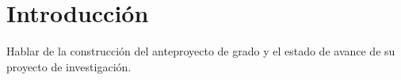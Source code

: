 \chapter{Introducción}
\ifpdf
    \graphicspath{{Introduction/IntroductionFigs/PNG/}{Introduction/IntroductionFigs/PDF/}{Introduction/IntroductionFigs/}}
\else
    \graphicspath{{Introduction/IntroductionFigs/EPS/}{Introduction/IntroductionFigs/}}
\fi

Hablar de la construcción del anteproyecto de grado y el estado de avance de su proyecto de investigación.

